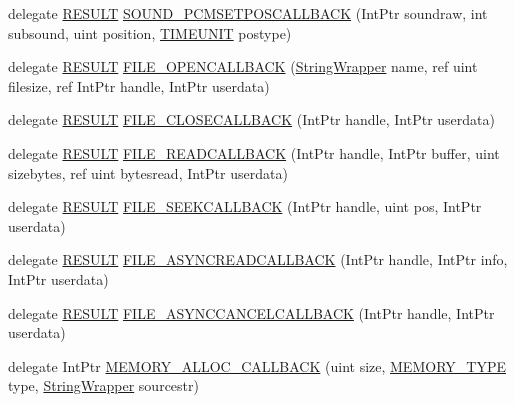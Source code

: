 \begin{DoxyCompactItemize}
\item 
delegate \hyperlink{namespace_f_m_o_d_a305d1176ef3f8c8815861a60407ac33d}{R\+E\+S\+U\+LT} \hyperlink{namespace_f_m_o_d_a93c01c9130331e86b54d0461c65c0c54}{S\+O\+U\+N\+D\+\_\+\+P\+C\+M\+S\+E\+T\+P\+O\+S\+C\+A\+L\+L\+B\+A\+CK} (Int\+Ptr soundraw, int subsound, uint position, \hyperlink{namespace_f_m_o_d_aff20975332f93ff2180d2681cb43929f}{T\+I\+M\+E\+U\+N\+IT} postype)
\item 
delegate \hyperlink{namespace_f_m_o_d_a305d1176ef3f8c8815861a60407ac33d}{R\+E\+S\+U\+LT} \hyperlink{namespace_f_m_o_d_a6aacb40c0bfa3448934de11beb9ed447}{F\+I\+L\+E\+\_\+\+O\+P\+E\+N\+C\+A\+L\+L\+B\+A\+CK} (\hyperlink{struct_f_m_o_d_1_1_string_wrapper}{String\+Wrapper} name, ref uint filesize, ref Int\+Ptr handle, Int\+Ptr userdata)
\item 
delegate \hyperlink{namespace_f_m_o_d_a305d1176ef3f8c8815861a60407ac33d}{R\+E\+S\+U\+LT} \hyperlink{namespace_f_m_o_d_ae4fc590f93bf7202703858219d3b2fbd}{F\+I\+L\+E\+\_\+\+C\+L\+O\+S\+E\+C\+A\+L\+L\+B\+A\+CK} (Int\+Ptr handle, Int\+Ptr userdata)
\item 
delegate \hyperlink{namespace_f_m_o_d_a305d1176ef3f8c8815861a60407ac33d}{R\+E\+S\+U\+LT} \hyperlink{namespace_f_m_o_d_a074a94c39aa2d2569a57ed255f6c9011}{F\+I\+L\+E\+\_\+\+R\+E\+A\+D\+C\+A\+L\+L\+B\+A\+CK} (Int\+Ptr handle, Int\+Ptr buffer, uint sizebytes, ref uint bytesread, Int\+Ptr userdata)
\item 
delegate \hyperlink{namespace_f_m_o_d_a305d1176ef3f8c8815861a60407ac33d}{R\+E\+S\+U\+LT} \hyperlink{namespace_f_m_o_d_a5fb329aae3aea0658fa46c593359ead3}{F\+I\+L\+E\+\_\+\+S\+E\+E\+K\+C\+A\+L\+L\+B\+A\+CK} (Int\+Ptr handle, uint pos, Int\+Ptr userdata)
\item 
delegate \hyperlink{namespace_f_m_o_d_a305d1176ef3f8c8815861a60407ac33d}{R\+E\+S\+U\+LT} \hyperlink{namespace_f_m_o_d_a12de5190001a0edf457fa49c0a2bde10}{F\+I\+L\+E\+\_\+\+A\+S\+Y\+N\+C\+R\+E\+A\+D\+C\+A\+L\+L\+B\+A\+CK} (Int\+Ptr handle, Int\+Ptr info, Int\+Ptr userdata)
\item 
delegate \hyperlink{namespace_f_m_o_d_a305d1176ef3f8c8815861a60407ac33d}{R\+E\+S\+U\+LT} \hyperlink{namespace_f_m_o_d_a3122c90ec3ea0bfc0ec3b7372267b5f1}{F\+I\+L\+E\+\_\+\+A\+S\+Y\+N\+C\+C\+A\+N\+C\+E\+L\+C\+A\+L\+L\+B\+A\+CK} (Int\+Ptr handle, Int\+Ptr userdata)
\item 
delegate Int\+Ptr \hyperlink{namespace_f_m_o_d_aff9ff44d1da401acbc19faf64e06a776}{M\+E\+M\+O\+R\+Y\+\_\+\+A\+L\+L\+O\+C\+\_\+\+C\+A\+L\+L\+B\+A\+CK} (uint size, \hyperlink{namespace_f_m_o_d_a3eb4c9654cbf371b668f8eb46358e931}{M\+E\+M\+O\+R\+Y\+\_\+\+T\+Y\+PE} type, \hyperlink{struct_f_m_o_d_1_1_string_wrapper}{String\+Wrapper} sourcestr)

\end{DoxyCompactItemize}
